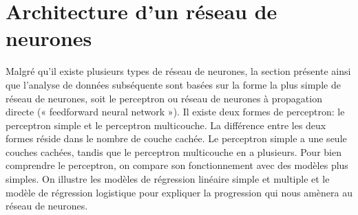 \section{Architecture d'un réseau de neurones}
\label{sec:RN:architecture}

Malgré qu'il existe plusieurs types de réseau de neurones, la section présente ainsi que l'analyse de données subséquente sont basées sur la forme la plus simple de réseau de neurones, soit le perceptron ou réseau de neurones à propagation directe (« feedforward neural network »). Il existe deux formes de perceptron: le perceptron simple et le perceptron multicouche.  La différence entre les deux formes réside dans le nombre de couche cachée. Le perceptron simple a une seule couches cachées, tandis que le perceptron multicouche en a plusieurs. Pour bien comprendre le perceptron, on compare son fonctionnement avec des modèles plus simples. On illustre les modèles de régression linéaire simple et multiple et le modèle de régression logistique pour expliquer la progression qui nous amènera au réseau de neurones.

\def\layersep{2.5cm}

